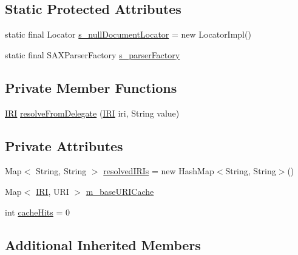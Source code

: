 \subsection*{Static Protected Attributes}
\begin{DoxyCompactItemize}
\item 
static final Locator \hyperlink{classorg_1_1semanticweb_1_1owlapi_1_1rdf_1_1syntax_1_1_r_d_f_parser_af5ac53921f9d7e7b9ccef6cf303f2668}{s\-\_\-null\-Document\-Locator} = new Locator\-Impl()
\item 
static final S\-A\-X\-Parser\-Factory \hyperlink{classorg_1_1semanticweb_1_1owlapi_1_1rdf_1_1syntax_1_1_r_d_f_parser_a050ed39d3710511dd24377cf43e6d7cd}{s\-\_\-parser\-Factory}
\end{DoxyCompactItemize}
\subsection*{Private Member Functions}
\begin{DoxyCompactItemize}
\item 
\hyperlink{classorg_1_1semanticweb_1_1owlapi_1_1model_1_1_i_r_i}{I\-R\-I} \hyperlink{classorg_1_1semanticweb_1_1owlapi_1_1rdf_1_1syntax_1_1_r_d_f_parser_ace910a409d4f91e361b8d5d8161822c8}{resolve\-From\-Delegate} (\hyperlink{classorg_1_1semanticweb_1_1owlapi_1_1model_1_1_i_r_i}{I\-R\-I} iri, String value)
\end{DoxyCompactItemize}
\subsection*{Private Attributes}
\begin{DoxyCompactItemize}
\item 
Map$<$ String, String $>$ \hyperlink{classorg_1_1semanticweb_1_1owlapi_1_1rdf_1_1syntax_1_1_r_d_f_parser_ae6a0df1df5f38c7037492a153f5900b7}{resolved\-I\-R\-Is} = new Hash\-Map$<$String, String$>$()
\item 
Map$<$ \hyperlink{classorg_1_1semanticweb_1_1owlapi_1_1model_1_1_i_r_i}{I\-R\-I}, U\-R\-I $>$ \hyperlink{classorg_1_1semanticweb_1_1owlapi_1_1rdf_1_1syntax_1_1_r_d_f_parser_ae4f7326b2123b3110d69750bd50a2811}{m\-\_\-base\-U\-R\-I\-Cache}
\item 
int \hyperlink{classorg_1_1semanticweb_1_1owlapi_1_1rdf_1_1syntax_1_1_r_d_f_parser_a5fc485366d6e536eaeb7390946032790}{cache\-Hits} = 0
\end{DoxyCompactItemize}
\subsection*{Additional Inherited Members}


